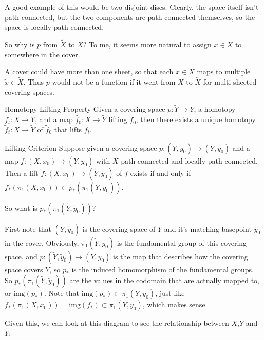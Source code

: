 \documentclass[12pt]{article}
\begin{document}
A good example of this would be two disjoint discs. Clearly, the space itself isn't path connected, but the two components are 
path-connected themselves, so the space is locally path-connected.

\begin{aq}
  So why is $p$ from $\tilde{X}$ to $X$? To me, it seems more natural to assign $x \in X$ to somewhere in the cover. 
\end{aq}
\begin{answer}
  A cover could have more than one sheet, so that each $x \in X$ maps to multiple $\tilde{x} \in \tilde{X}$. Thus $p$ would 
  not be a function if it went from $X$ to $\tilde{X}$ for multi-sheeted covering spaces. 
\end{answer}
\begin{theorem}{Homotopy Lifting Property}
  Given a covering space $p: \tilde{Y} \to Y$, a homotopy $f_t: X \to Y$, and a map $\tilde{f_0}: X \to \tilde{Y}$ lifting $f_0$, 
  then there exists a unique homotopy $\tilde{f}_t:X \to \tilde{Y}$ of $\tilde{f}_0$ that lifts $f_t$.
\end{theorem}

\begin{theorem}{Lifting Criterion}
  Suppose given a covering space $p:(\tilde{Y},\tilde{y}_0) \to (Y, y_0)$ and a map $f:(X,x_0) \to (Y, y_0)$ with 
  $X$ path-connected and locally path-connected. Then a lift $\tilde{f}: (X,x_0) \to (\tilde{Y}, \tilde{y}_0)$ 
  of $f$ exists if and only if $f_*(\pi_1(X,x_0)) \subset p_*(\pi_1(\tilde{Y},\tilde{y}_0))$.
\end{theorem}
\begin{aq}
  So what is $p_*(\pi_1(\tilde{Y},\tilde{y}_0))$?
\end{aq}
\begin{answer}
  First note that $(\tilde{Y}, \tilde{y}_0)$ is the covering space of $Y$ and it's matching basepoint $y_0$ in the cover. 
  Obviously, $\pi_1(\tilde{Y},\tilde{y}_0)$ is the fundamental group of this covering space, and $p: (\tilde{Y}, \tilde{y}_0) 
  \to (Y,y_0)$ is the map that describes how the covering space covers $Y$, so $p_*$ is the induced homomorphism of the 
  fundamental groups. So $p_*(\pi_1(\tilde{Y},\tilde{y}_0))$ are the values in the codomain that are actually mapped to, or 
  $\text{img}(p_*)$. Note that $\text{img}(p_*) \subset \pi_1(Y,y_0)$, just like $f_*(\pi_1(X,x_0)) = \text{img}(f_*) \subset 
  \pi_1(Y,y_0)$, which makes sense.
\end{answer}

Given this, we can look at this diagram to see the relationship between $X$,$Y$ and $\tilde{Y}$: 
\end{document}
